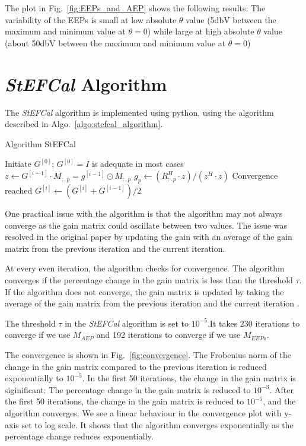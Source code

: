 \documentclass[10pt,a4paper,twocolumn]{paper}
\begin{document}
The plot in Fig.~\ref{fig:EEPs_and_AEP} shows the following results: The variability of the EEPs is small at low absolute $\theta$ value (5dbV between the maximum and minimum value at $\theta = 0$) while large at high absolute $\theta$ value (about 50dbV between the maximum and minimum value at $\theta = 0$)

\section{\textit{StEFCal} Algorithm}
The \textit{StEFCal} algorithm is implemented using python, using the algorithm described in Algo.~\ref{algo:stefcal_algorithm}. 

\begin{algorithm}
\caption{Algorithm StEFCal}
\begin{algorithmic}[1]
\State Initiate $G^{[0]}$; $G^{[0]} = I$ is adequate in most cases
        \State $z \leftarrow G^{[i-1]} \cdot M_{:,p} = g^{[i-1]} \odot M_{:,p}$
        \State $g_p \leftarrow (R_{:,p}^H \cdot z)/(z^H \cdot z)$
    \EndFor
            \State Convergence reached
        \Else
            \State $G^{[i]} \leftarrow (G^{[i]} + G^{[i-1]})/2$
        \EndIf
    \EndIf
\EndFor
\label{algo:stefcal_algorithm}
\end{algorithmic}
\end{algorithm}


One practical issue with the algorithm is that the algorithm may not always converge as the gain matrix could oscillate between two values. The issue was resolved in the original paper by updating the gain with an average of the gain matrix from the previous iteration and the current iteration\cite{Salvini_2014}.

At every even iteration, the algorithm checks for convergence. The algorithm converges if the percentage change in the gain matrix is less than the threshold $\tau$. If the algorithm does not converge, the gain matrix is updated by taking the average of the gain matrix from the previous iteration and the current iteration \cite{Salvini_2014}.

The threshold $\tau$ in the \textit{StEFCal} algorithm is set to $10^{-5}$.It takes 230 iterations to converge if we use $M_{AEP}$ and 192 iterations to converge if we use $M_{EEPs}$.

The convergence is shown in Fig.~\ref{fig:convergence}. The Frobenius norm of the change in the gain matrix compared to the previous iteration is reduced exponentially to $10^{-5}$.
In the first 50 iterations, the change in the gain matrix is siginificant: The percentage change in the gain matrix is reduced to $10^{-3}$. After the first 50 iterations, the change in the gain matrix is reduced to $10^{-5}$, and the algorithm converges. We see a linear behaviour in the convergence plot with y-axis set to log scale. It shows that the algorithm converges exponentially as the percentage change reduces exponentially.
\end{document}
